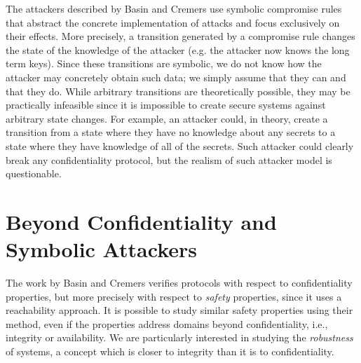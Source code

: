 The attackers described by Basin and Cremers use symbolic compromise rules that abstract the concrete implementation of attacks and focus exclusively on their effects. More precisely, a transition generated by a compromise rule changes the state of the knowledge of the attacker (e.g. the attacker now knows the long term keys). Since these transitions are symbolic, we do not know how the attacker may concretely obtain such data; we simply assume that they can and that they do. %
While arbitrary transitions are theoretically possible, they may be practically infeasible since it is impossible to create secure systems against arbitrary state changes. For example, an attacker could, in theory, create a transition from a state where they have no knowledge about any secrets to a state where they have knowledge of all of the secrets. Such attacker could clearly break any confidentiality protocol, but the realism of such attacker model is questionable. 

\section{Beyond Confidentiality and Symbolic Attackers}
The work by Basin and Cremers verifies protocols with respect to confidentiality properties, but more precisely with respect to \emph{safety} properties, since it uses a reachability approach. It is possible to study similar safety properties using their method, even if the properties address domains beyond confidentiality, i.e., integrity or availability. We are particularly interested in studying the \emph{robustness} of systems, a concept which is closer to integrity than it is to confidentiality. 

